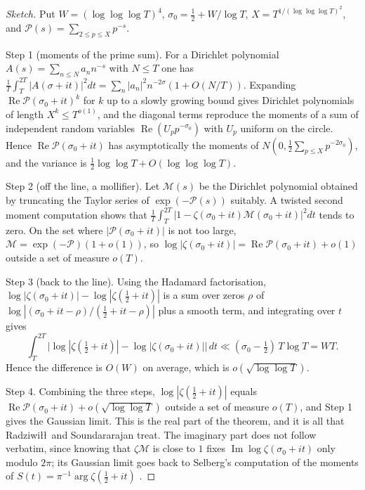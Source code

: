 \begin{proof}[Sketch]
Put $W=(\log\log\log T)^4$, $\sigma_0=\frac12+W/\log T$, $X=T^{1/(\log\log\log T)^2}$, and $\mathcal{P}(s)=\sum_{2\le p\le X}p^{-s}$.

Step 1 (moments of the prime sum). For a Dirichlet polynomial $A(s)=\sum_{n\le N}a_nn^{-s}$ with $N\le T$ one has $\frac1T\int_T^{2T}|A(\sigma+it)|^2dt=\sum_n|a_n|^2n^{-2\sigma}(1+O(N/T))$. Expanding $\operatorname{Re}\mathcal{P}(\sigma_0+it)^k$ for $k$ up to a slowly growing bound gives Dirichlet polynomials of length $X^k\le T^{o(1)}$, and the diagonal terms reproduce the moments of a sum of independent random variables $\operatorname{Re}(U_pp^{-\sigma_0})$ with $U_p$ uniform on the circle. Hence $\operatorname{Re}\mathcal{P}(\sigma_0+it)$ has asymptotically the moments of $N(0,\frac12\sum_{p\le X}p^{-2\sigma_0})$, and the variance is $\frac12\log\log T+O(\log\log\log T)$.

Step 2 (off the line, a mollifier). Let $\mathcal{M}(s)$ be the Dirichlet polynomial obtained by truncating the Taylor series of $\exp(-\mathcal{P}(s))$ suitably. A twisted second moment computation shows that $\frac1T\int_T^{2T}|1-\zeta(\sigma_0+it)\mathcal{M}(\sigma_0+it)|^2dt$ tends to zero. On the set where $|\mathcal{P}(\sigma_0+it)|$ is not too large, $\mathcal{M}=\exp(-\mathcal{P})(1+o(1))$, so $\log|\zeta(\sigma_0+it)|=\operatorname{Re}\mathcal{P}(\sigma_0+it)+o(1)$ outside a set of measure $o(T)$.

Step 3 (back to the line). Using the Hadamard factorisation, $\log|\zeta(\sigma_0+it)|-\log|\zeta(\frac12+it)|$ is a sum over zeros $\rho$ of $\log|(\sigma_0+it-\rho)/(\frac12+it-\rho)|$ plus a smooth term, and integrating over $t$ gives
\[
\int_T^{2T}\bigl|\log|\zeta(\tfrac12+it)|-\log|\zeta(\sigma_0+it)|\bigr|\,dt\ll(\sigma_0-\tfrac12)\,T\log T=WT .
\]
Hence the difference is $O(W)$ on average, which is $o(\sqrt{\log\log T})$.

Step 4. Combining the three steps, $\log|\zeta(\frac12+it)|$ equals $\operatorname{Re}\mathcal{P}(\sigma_0+it)+o(\sqrt{\log\log T})$ outside a set of measure $o(T)$, and Step 1 gives the Gaussian limit. This is the real part of the theorem, and it is all that Radziwi\l\l\ and Soundararajan treat. The imaginary part does not follow verbatim, since knowing that $\zeta\mathcal{M}$ is close to $1$ fixes $\operatorname{Im}\log\zeta(\sigma_0+it)$ only modulo $2\pi$; its Gaussian limit goes back to Selberg's computation of the moments of $S(t)=\pi^{-1}\arg\zeta(\frac12+it)$ \cite{selberg1946}.
\end{proof}

